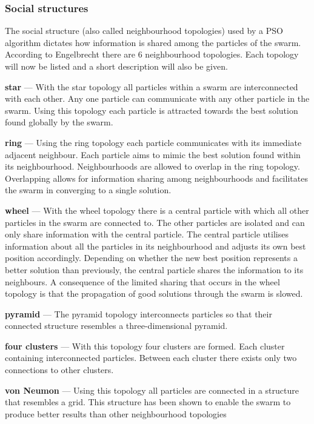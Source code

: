 \subsubsection{Social structures}
The  social structure (also called neighbourhood topologies) used by a \gls{PSO} algorithm dictates how information is shared among the particles of the swarm. According to Engelbrecht\cite{FundamentalSwarm} there are 6 neighbourhood topologies. Each topology will now be listed and a short description will also be given.
\begin{description}
\item{\textbf{star}} --- With the star topology all particles within a swarm are interconnected with each other. Any one particle can communicate with any other particle in the swarm\cite{FundamentalSwarm}. Using this topology each particle is attracted towards the best solution found globally by the swarm\cite{FundamentalSwarm}. 
\item{\textbf{ring}} --- Using the ring topology each particle communicates with its immediate adjacent neighbour\cite{FundamentalSwarm}. Each particle aims to mimic the best solution found within its neighbourhood\cite{FundamentalSwarm}. Neighbourhoods are allowed to overlap in the ring topology\cite{FundamentalSwarm}. Overlapping allows for information sharing among neighbourhoods and facilitates the swarm in converging to a single solution\cite{FundamentalSwarm}. 
\item{\textbf{wheel}} --- With the wheel topology there is a central particle with which all other particles in the swarm are connected to\cite{FundamentalSwarm}. The other particles are isolated and can only share information with the central particle\cite{FundamentalSwarm}. The central particle utilises information about all the particles in its neighbourhood and adjusts its own best position accordingly\cite{FundamentalSwarm}. Depending on whether the new best position represents a better solution than previously, the central particle shares the information to its neighbours\cite{FundamentalSwarm}. A consequence of the limited sharing that occurs in the wheel topology is that the propagation of good solutions through the swarm is slowed\cite{FundamentalSwarm}.
\item{\textbf{pyramid}} --- The pyramid topology interconnects particles so that their connected structure resembles a three-dimensional pyramid\cite{FundamentalSwarm}.
\item{\textbf{four clusters}} --- With this topology four clusters are formed. Each cluster containing interconnected particles\cite{FundamentalSwarm}. Between each cluster there exists only two connections to other clusters\cite{FundamentalSwarm}.
\item{\textbf{von Neumon}} --- Using this topology all particles are connected in a structure that resembles a grid\cite{FundamentalSwarm}. This structure has been shown to enable the swarm to produce better results than other neighbourhood topologies\cite{FundamentalSwarm}
\end{description}

